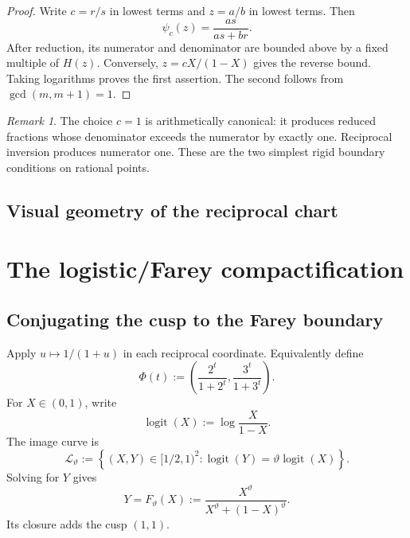 \documentclass[10pt,oneside]{article}
\theoremstyle{definition}
\theoremstyle{remark}
\newtheorem{remark}[theorem]{Remark}
\newcommand{\thetaq}{\vartheta}
\newcommand{\logcurve}{\mathcal L_{\thetaq}}
\newcommand{\logit}{\operatorname{logit}}
\begin{document}
\begin{proof}
Write \(c=r/s\) in lowest terms and \(z=a/b\) in lowest terms.  Then
\[
 \psi_c(z)=\frac{as}{as+br}.
\]
After reduction, its numerator and denominator are bounded above by a fixed multiple of \(H(z)\).  Conversely, \(z=cX/(1-X)\) gives the reverse bound.  Taking logarithms proves the first assertion.  The second follows from \(\gcd(m,m+1)=1\).
\end{proof}

\begin{remark}
The choice \(c=1\) is arithmetically canonical: it produces reduced fractions whose denominator exceeds the numerator by exactly one.  Reciprocal inversion produces numerator one.  These are the two simplest rigid boundary conditions on rational points.
\end{remark}

\subsection{Visual geometry of the reciprocal chart}
\begin{center}
\end{center}

\section{The logistic/Farey compactification}
\label{sec:logistic}

\subsection{Conjugating the cusp to the Farey boundary}
Apply \(u\mapsto1/(1+u)\) in each reciprocal coordinate.  Equivalently define
\[
 \Phi(t):=\left(\frac{2^t}{1+2^t},\frac{3^t}{1+3^t}\right).
\]
For \(X\in(0,1)\), write
\[
 \logit(X):=\log\frac{X}{1-X}.
\]
The image curve is
\[
 \logcurve:=\left\{(X,Y)\in[1/2,1)^2:
 \logit(Y)=\thetaq\logit(X)\right\}.
\]
Solving for \(Y\) gives
\begin{equation}
 Y=F_{\thetaq}(X):=
 \frac{X^{\thetaq}}{X^{\thetaq}+(1-X)^{\thetaq}}.
 \label{eq:logistic-graph}
\end{equation}
Its closure adds the cusp \((1,1)\).
\end{document}
